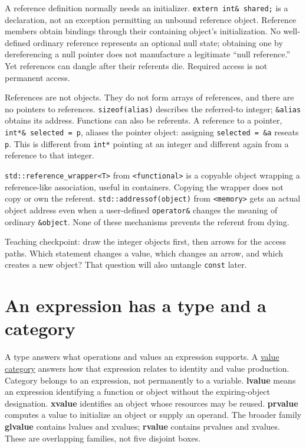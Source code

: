 A reference definition normally needs an initializer. \texttt{extern\ int\&\ shared;} is a declaration, not an exception permitting an unbound reference object. Reference members obtain bindings through their containing object's initialization. No well-defined ordinary reference represents an optional null state; obtaining one by dereferencing a null pointer does not manufacture a legitimate ``null reference.'' Yet references can dangle after their referents die. Required access is not permanent access.

References are not objects. They do not form arrays of references, and there are no pointers to references. \texttt{sizeof(alias)} describes the referred-to integer; \texttt{\&alias} obtains its address. Functions can also be referents. A reference to a pointer, \texttt{int*\&\ selected\ =\ p}, aliases the pointer object: assigning \texttt{selected\ =\ \&a} reseats \texttt{p}. This is different from \texttt{int*} pointing at an integer and different again from a reference to that integer.

\texttt{std::reference\_wrapper\textless{}T\textgreater{}} from \texttt{\textless{}functional\textgreater{}} is a copyable object wrapping a reference-like association, useful in containers. Copying the wrapper does not copy or own the referent. \texttt{std::addressof(object)} from \texttt{\textless{}memory\textgreater{}} gets an actual object address even when a user-defined \texttt{operator\&} changes the meaning of ordinary \texttt{\&object}. None of these mechanisms prevents the referent from dying.

Teaching checkpoint: draw the integer objects first, then arrows for the access paths. Which statement changes a value, which changes an arrow, and which creates a new object? That question will also untangle \texttt{const} later.

\section{An expression has a type and a category}\label{05-engine-i-ch003-an-expression-has-a-type-and-a-category}

A type answers what operations and values an expression supports. A \hyperref[appendix-1121b30eaeb0]{value category} answers how that expression relates to identity and value production. Category belongs to an expression, not permanently to a variable. \textbf{lvalue} means an expression identifying a function or object without the expiring-object designation. \textbf{xvalue} identifies an object whose resources may be reused. \textbf{prvalue} computes a value to initialize an object or supply an operand. The broader family \textbf{glvalue} contains lvalues and xvalues; \textbf{rvalue} contains prvalues and xvalues. These are overlapping families, not five disjoint boxes.

